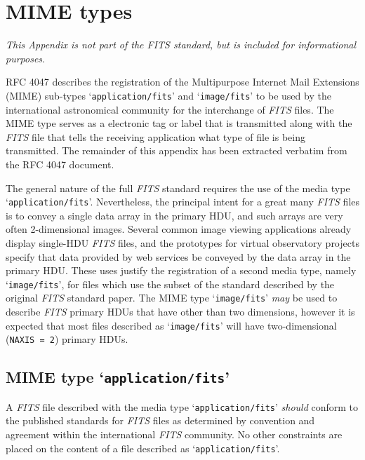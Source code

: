 \documentclass[onecolumn]{aa}
\begin{document}

\section{MIME types}
\label{s:MIMETypes}
{\em This Appendix is not part of the {\em FITS\/} standard, 
but is included for informational purposes}.

RFC 4047 \citep{rfc4047} describes the registration of the Multipurpose Internet
Mail Extensions (MIME) sub-types `{\tt application/fits}' and `{\tt image/fits}'
to be used by the international astronomical community for the interchange 
of {\em FITS\/} files.   The MIME type serves as a electronic tag or label that is
transmitted along with the {\em FITS\/} file that tells the
receiving application what type of file is being transmitted.  
The remainder of this appendix has been extracted verbatim from the RFC 4047 document.

  The general nature of the full {\em FITS\/} standard requires the use of the
  media type `{\tt application/fits}'.  Nevertheless, the principal intent
  for a great many {\em FITS\/} files is to convey a single data array in the
  primary HDU, and such arrays are very often 2-dimensional images.  Several
  common image viewing applications already display single-HDU {\em FITS\/}
  files, and the prototypes for virtual observatory projects specify
  that data provided by web services be conveyed by the data array in
  the primary HDU.  These uses justify the registration of a second media
  type, namely `{\tt image/fits}', for files which use the subset of the
  standard described by the original {\em FITS\/} standard paper.
  The MIME type `{\tt image/fits}'
  {\em may} be used to describe {\em FITS\/} primary HDUs that have other than two
  dimensions, however it is expected that most files described as `{\tt image/fits}' will
  have two-dimensional ({\tt NAXIS = 2}) primary HDUs.

\subsection{MIME type `{\tt application/fits}'}

  A {\em FITS\/} file described with the media type `{\tt application/fits}' {\em should}
  conform to the published standards for {\em FITS\/} files as determined by
  convention and agreement within the international {\em FITS\/} community.  No
  other constraints are placed on the content of a file described as
  `{\tt application/fits}'.
\end{document}

